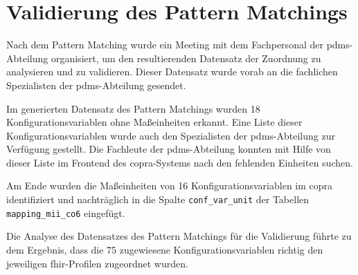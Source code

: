 \section{Validierung des Pattern Matchings } \label{sec:validmethode}

Nach dem Pattern Matching wurde ein Meeting mit dem Fachpersonal der \ac{pdms}-Abteilung organisiert, um den resultierenden Datensatz der Zuordnung zu analysieren und zu validieren. Dieser Datensatz wurde vorab an die fachlichen Spezialisten der \ac{pdms}-Abteilung gesendet.

Im generierten Datensatz des Pattern Matchings wurden 18 Konfigurationsvariablen ohne Maßeinheiten erkannt. Eine Liste dieser Konfigurationsvariablen wurde auch den Spezialisten der \ac{pdms}-Abteilung zur Verfügung gestellt. Die Fachleute der \ac{pdms}-Abteilung konnten mit Hilfe von dieser Liste im Frontend des \ac{copra}-Systems nach den fehlenden Einheiten suchen.

Am Ende wurden die Maßeinheiten von 16 Konfigurationsvariablen im \ac{copra} identifiziert und nachträglich in die Spalte \texttt{conf\_var\_unit} der Tabellen \texttt{mapping\_mii\_co6} eingefügt.

Die Analyse des Datensatzes des Pattern Matchings für die Validierung führte zu dem Ergebnis, dass die 75 zugewiesene Konfigurationsvariablen richtig den jeweiligen \ac{fhir}-Profilen zugeordnet wurden.